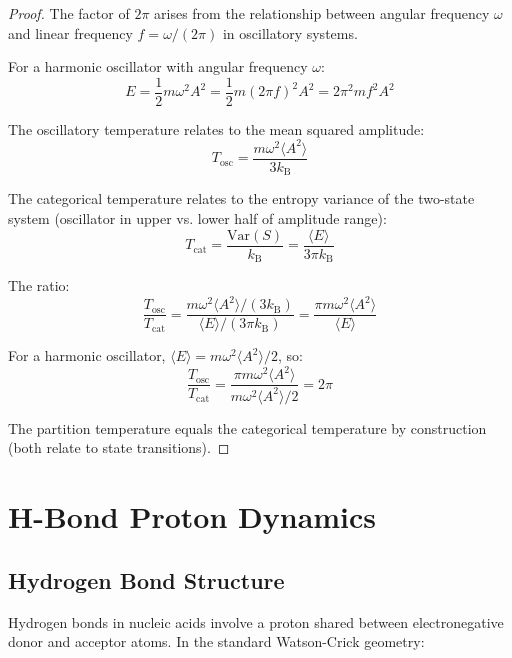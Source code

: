 \documentclass[twocolumn,10pt]{article}
\theoremstyle{remark}
\newcommand{\kB}{k_{\mathrm{B}}}
\begin{document}
\begin{proof}
The factor of $2\pi$ arises from the relationship between angular frequency $\omega$ and linear frequency $f = \omega/(2\pi)$ in oscillatory systems.

For a harmonic oscillator with angular frequency $\omega$:
\begin{equation}
E = \frac{1}{2}m\omega^2 A^2 = \frac{1}{2}m(2\pi f)^2 A^2 = 2\pi^2 m f^2 A^2
\end{equation}

The oscillatory temperature relates to the mean squared amplitude:
\begin{equation}
T_{\mathrm{osc}} = \frac{m\omega^2\langle A^2 \rangle}{3\kB}
\end{equation}

The categorical temperature relates to the entropy variance of the two-state system (oscillator in upper vs. lower half of amplitude range):
\begin{equation}
T_{\mathrm{cat}} = \frac{\mathrm{Var}(S)}{\kB} = \frac{\langle E \rangle}{3\pi\kB}
\end{equation}

The ratio:
\begin{equation}
\frac{T_{\mathrm{osc}}}{T_{\mathrm{cat}}} = \frac{m\omega^2\langle A^2 \rangle/(3\kB)}{\langle E \rangle/(3\pi\kB)} = \frac{\pi m\omega^2\langle A^2 \rangle}{\langle E \rangle}
\end{equation}

For a harmonic oscillator, $\langle E \rangle = m\omega^2\langle A^2 \rangle/2$, so:
\begin{equation}
\frac{T_{\mathrm{osc}}}{T_{\mathrm{cat}}} = \frac{\pi m\omega^2\langle A^2 \rangle}{m\omega^2\langle A^2 \rangle/2} = 2\pi
\end{equation}

The partition temperature equals the categorical temperature by construction (both relate to state transitions).
\end{proof}

\section{H-Bond Proton Dynamics}

\subsection{Hydrogen Bond Structure}

Hydrogen bonds in nucleic acids involve a proton shared between electronegative donor and acceptor atoms. In the standard Watson-Crick geometry:
\end{document}
